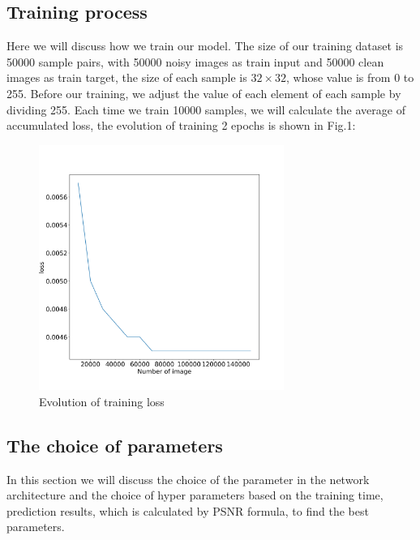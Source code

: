 \subsection{Training process}
Here we will discuss how we train our model. The size of our training dataset is 50000 sample pairs, with 50000 noisy images as train input and 50000 clean images as train target, the size of each sample is $32\times32$, whose value is from 0 to 255. Before our training, we adjust the value of each element of each sample by dividing 255. Each time we train 10000 samples, we will calculate the average of accumulated loss, the evolution of training 2 epochs is shown in Fig.1:
\begin{figure}[h]
    \begin{center}
        \includegraphics[width=8cm]{contents/evolution of training loss.png}
        \caption{Evolution of training loss}
        \label{Evolution of training loss}
    \end{center}
\end{figure}
\subsection{The choice of parameters}
In this section we will discuss the choice of the parameter in the network architecture and the choice of hyper parameters based on the training time, prediction results, which is calculated by PSNR formula, to find the best parameters.

